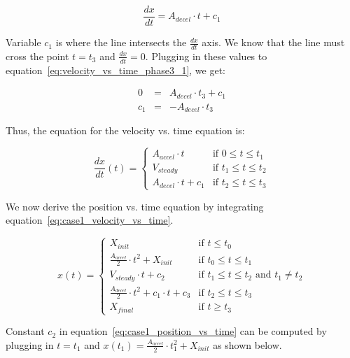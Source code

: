 \documentclass[11pt]{article} %
\begin{document}
\begin{equation}
\frac{dx}{dt} = A_{decel} \cdot t + c_1 
\label{eq:velocity_vs_time_phase3_1}
\end{equation}

\noindent Variable $c_1$ is where the line intersects the $\frac{dx}{dt}$ axis.  We know that the line must cross the point $t = t_3$ and $\frac{dx}{dt} = 0$. Plugging in these values to equation~\ref{eq:velocity_vs_time_phase3_1}, we get:

\begin{eqnarray}
0 & = & A_{decel} \cdot t_3 + c_1\nonumber \\
c_1 & = & -A_{decel} \cdot t_3
\end{eqnarray}

\noindent Thus, the equation for the velocity vs. time equation is:

\begin{equation}
\frac{dx}{dt}(t) = \left\{
  \begin{array}{rl}
     A_{accel}  \cdot t & \text{if } 0 \le t \le t_1\\
    V_{steady} & \text{if } t_1 \le t \le t_2 \\
     A_{decel}  \cdot t + c_1 & \text{if } t_2 \le t \le t_3 
  \end{array} \right.
\label{eq:case1_velocity_vs_time}
\end{equation}

\noindent We now derive the position vs. time equation by integrating equation~\ref{eq:case1_velocity_vs_time}.

\begin{equation}
x(t) = \left\{
  \begin{array}{rl}
    X_{init} &  \text{if }  t  \le t_0\\
    \frac{A_{accel}}{2} \cdot t^{2} + X_{init} &  \text{if } t_0 \le t \le t_1\\
    V_{steady} \cdot t + c_2 & \text{if } t_1 \le t \le t_2 \text{~and~} t_1 \ne t_2\\
    \frac{A_{decel}}{2} \cdot t^{2} + c_1 \cdot t + c_3 & \text{if } t_2 \le t \le t_3 \\
     X_{final} & \text{if } t \ge t_3 
  \end{array} \right.
 \label{eq:case1_position_vs_time}
\end{equation}

\noindent Constant $c_2$ in equation~\ref{eq:case1_position_vs_time} can be computed by plugging in $t = t_1$ and $x(t_1) = \frac{A_{accel}}{2} \cdot t_1^2 + X_{init}$ as shown below.
\end{document}
